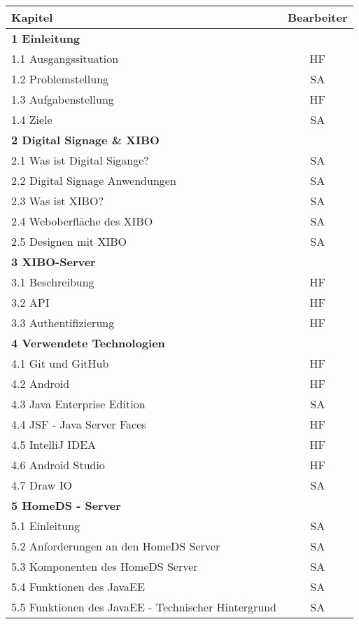 \vspace{0.5cm}
\begin{longtable}{| l | l | c |}
\multicolumn{2}{l}{\textbf{Kapitel}} & \multicolumn{1}{c}{\textbf{Bearbeiter}} \\ \hline
\multicolumn{3}{|l|}{\textbf{1 Einleitung}} \\ \hline
\multicolumn{2}{|l|}{1.1 Ausgangssituation} & HF \\
\multicolumn{2}{|l|}{1.2 Problemstellung} & SA \\
\multicolumn{2}{|l|}{1.3 Aufgabenstellung} & HF \\
\multicolumn{2}{|l|}{1.4 Ziele} & SA \\ \hline

\multicolumn{3}{|l|}{\textbf{2 Digital Signage \& XIBO}} \\ \hline
\multicolumn{2}{|l|}{2.1 Was ist Digital Sigange?} & SA \\
\multicolumn{2}{|l|}{2.2 Digital Signage Anwendungen} & SA \\
\multicolumn{2}{|l|}{2.3 Was ist XIBO?} & SA \\
\multicolumn{2}{|l|}{2.4 Weboberfläche des XIBO} & SA \\
\multicolumn{2}{|l|}{2.5 Designen mit XIBO} & SA \\ \hline

\multicolumn{3}{|l|}{\textbf{3 XIBO-Server}} \\ \hline
\multicolumn{2}{|l|}{3.1 Beschreibung} & HF \\
\multicolumn{2}{|l|}{3.2 API} & HF \\
\multicolumn{2}{|l|}{3.3 Authentifizierung} & HF \\ \hline

\multicolumn{3}{|l|}{\textbf{4 Verwendete Technologien}} \\ \hline
\multicolumn{2}{|l|}{4.1 Git und GitHub} & HF \\
\multicolumn{2}{|l|}{4.2 Android} & HF \\
\multicolumn{2}{|l|}{4.3 Java Enterprise Edition} & SA \\
\multicolumn{2}{|l|}{4.4 JSF - Java Server Faces} & HF \\
\multicolumn{2}{|l|}{4.5 IntelliJ IDEA} & HF \\
\multicolumn{2}{|l|}{4.6 Android Studio} & HF \\
\multicolumn{2}{|l|}{4.7 Draw IO} & SA \\ \hline

\multicolumn{3}{|l|}{\textbf{5 HomeDS - Server}} \\ \hline
\multicolumn{2}{|l|}{5.1 Einleitung} & SA \\
\multicolumn{2}{|l|}{5.2 Anforderungen an den HomeDS Server} & SA \\
\multicolumn{2}{|l|}{5.3 Komponenten des HomeDS Server} & SA \\
\multicolumn{2}{|l|}{5.4 Funktionen des JavaEE} & SA \\
\multicolumn{2}{|l|}{5.5 Funktionen des JavaEE - Technischer Hintergrund} & SA \\ \hline


\end{longtable}
